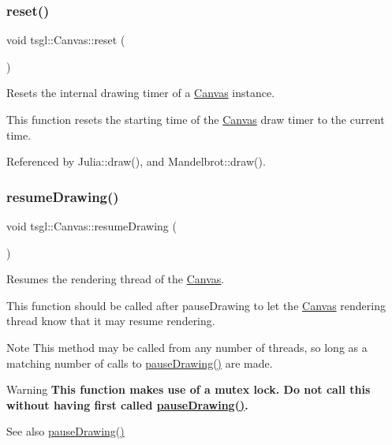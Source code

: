 \subsubsection{\texorpdfstring{reset()}{reset()}}
{\footnotesize\ttfamily void tsgl\+::\+Canvas\+::reset (\begin{DoxyParamCaption}{ }\end{DoxyParamCaption})}



Resets the internal drawing timer of a \hyperlink{classtsgl_1_1_canvas}{Canvas} instance. 

This function resets the starting time of the \hyperlink{classtsgl_1_1_canvas}{Canvas}\textquotesingle{} draw timer to the current time. 

Referenced by Julia\+::draw(), and Mandelbrot\+::draw().

\mbox{\label{classtsgl_1_1_canvas_a56bf3c6e4eb7b06015d1c115aaa143f8}} 
\subsubsection{\texorpdfstring{resume\+Drawing()}{resumeDrawing()}}
{\footnotesize\ttfamily void tsgl\+::\+Canvas\+::resume\+Drawing (\begin{DoxyParamCaption}{ }\end{DoxyParamCaption})}



Resumes the rendering thread of the \hyperlink{classtsgl_1_1_canvas}{Canvas}. 

This function should be called after pause\+Drawing to let the \hyperlink{classtsgl_1_1_canvas}{Canvas}\textquotesingle{} rendering thread know that it may resume rendering. \begin{DoxyNote}{Note}
This method may be called from any number of threads, so long as a matching number of calls to \hyperlink{classtsgl_1_1_canvas_abe021ab5148cc1327523689bced0f35a}{pause\+Drawing()} are made. 
\end{DoxyNote}
\begin{DoxyWarning}{Warning}
{\bfseries This function makes use of a mutex lock. Do not call this without having first called \hyperlink{classtsgl_1_1_canvas_abe021ab5148cc1327523689bced0f35a}{pause\+Drawing()}.} 
\end{DoxyWarning}
\begin{DoxySeeAlso}{See also}
\hyperlink{classtsgl_1_1_canvas_abe021ab5148cc1327523689bced0f35a}{pause\+Drawing()} 
\end{DoxySeeAlso}


